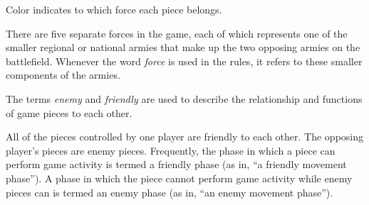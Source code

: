  Color indicates to which force each piece belongs.

There are five separate forces in the game, each of which represents one of the smaller regional or national armies that make up the two opposing armies on the battlefield. Whenever the word \emph{force} is used in the rules, it refers to these smaller components of the armies.

 The terms \emph{enemy} and \emph{friendly} are used to describe the relationship and functions of game pieces to each other.

All of the pieces controlled by one player are friendly to each other. The opposing player's pieces are enemy pieces. Frequently, the phase in which a piece can perform game activity is termed a friendly phase (as in, ``a friendly movement phase''). A phase in which the piece cannot perform game activity while enemy pieces can is termed an enemy phase (as in, ``an enemy movement phase'').
